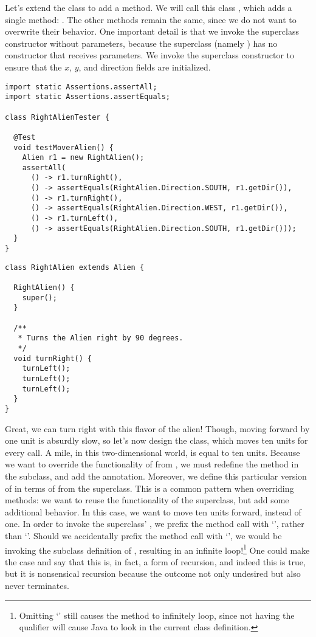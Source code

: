 Let's extend the  class to add a  method. We will call this class , which adds a single method: . The other methods remain the same, since we do not want to overwrite their behavior. One important detail is that we invoke the superclass constructor without parameters, because the superclass (namely ) has no constructor that receives parameters. We invoke the superclass constructor to ensure that the $x$, $y$, and direction fields are initialized.

\begin{lstlisting}[language=MyJava]
import static Assertions.assertAll;
import static Assertions.assertEquals;

class RightAlienTester {

  @Test
  void testMoverAlien() {
    Alien r1 = new RightAlien();
    assertAll(
      () -> r1.turnRight(),
      () -> assertEquals(RightAlien.Direction.SOUTH, r1.getDir()),
      () -> r1.turnRight(),
      () -> assertEquals(RightAlien.Direction.WEST, r1.getDir()),
      () -> r1.turnLeft(),
      () -> assertEquals(RightAlien.Direction.SOUTH, r1.getDir()));
  }
}
\end{lstlisting}

\begin{lstlisting}[language=MyJava]
class RightAlien extends Alien {

  RightAlien() { 
    super(); 
  }

  /**
   * Turns the Alien right by 90 degrees.
   */
  void turnRight() {
    turnLeft();
    turnLeft();
    turnLeft();
  }
}
\end{lstlisting}

Great, we can turn right with this flavor of the alien! 
Though, moving forward by one unit is absurdly slow, so let's now design the  class, which moves ten units for every  call. 
A mile, in this two-dimensional world, is equal to ten units. 
Because we want to override the functionality of  from , we must redefine the method in the subclass, and add the  annotation. 
Moreover, we define this particular version of  in terms of  from the superclass. 
This is a common pattern when overriding methods: we want to reuse the functionality of the superclass, but add some additional behavior. 
In this case, we want to move ten units forward, instead of one. 
In order to invoke the superclass' , we prefix the method call with `', rather than `'. 
Should we accidentally prefix the method call with `', we would be invoking the subclass definition of , resulting in an infinite loop!\footnote{Omitting `' still causes the method to infinitely loop, since not having the qualifier will cause Java to look in the current class definition.} 
One could make the case and say that this is, in fact, a form of recursion, and indeed this is true, but it is nonsensical recursion because the outcome not only undesired but also never terminates.

